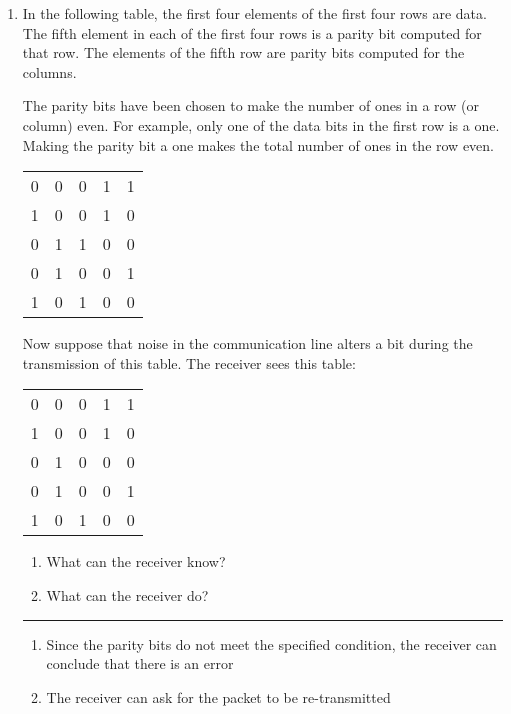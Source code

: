 \documentclass[twoside]{article}
\newenvironment{answer}
  {\vspace*{0.2cm} \rule{12cm}{0.04cm} \vspace*{0.2cm}}
  {\vspace*{0.2cm}}
\begin{document}
\begin{enumerate}
\begin{answer}
    \end{answer}

  \item In the following table, the first four elements of the
    first four rows are data. The fifth element in each of the 
    first four rows is a parity bit computed for that row.
    The elements of the fifth row are parity bits computed
    for the columns.

    The parity bits have been chosen to make the number of
    ones in a row (or column) even.
    For example, only one of the data bits in the first row
    is a one. Making the parity bit a one makes the total
    number of ones in the row even.

  \begin{tabular}{llll|l}
    0 & 0 & 0 & 1 & 1 \\
    1 & 0 & 0 & 1 & 0 \\
    0 & 1 & 1 & 0 & 0 \\
    0 & 1 & 0 & 0 & 1 \\ \hline
    1 & 0 & 1 & 0 & 0
    \end{tabular}

    Now suppose that noise in the communication line
    alters a bit during the transmission of this table.
    The receiver sees this table:

  \begin{tabular}{llll|l}
    0 & 0 & 0 & 1 & 1 \\
    1 & 0 & 0 & 1 & 0 \\
    0 & 1 & 0 & 0 & 0 \\
    0 & 1 & 0 & 0 & 1 \\ \hline
    1 & 0 & 1 & 0 & 0
    \end{tabular}

    \begin{enumerate}
      \item What can the receiver know?
      \item What can the receiver do?
      \end{enumerate}

  \begin{answer}

  \begin{enumerate}
    \item Since the parity bits do not meet the specified condition, the receiver can conclude that there is an error
    \item The receiver can ask for the packet to be re-transmitted
    \end{enumerate}


\end{answer}
\end{enumerate}
\end{document}
